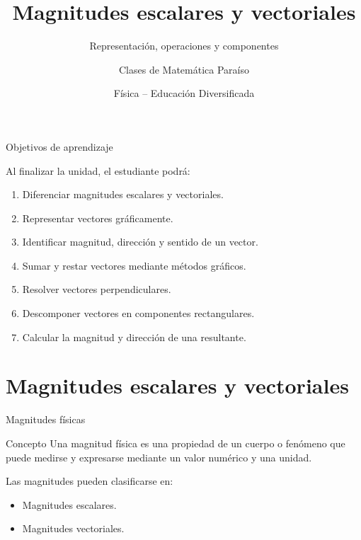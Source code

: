 \documentclass[aspectratio=169,11pt]{beamer}
\title{Magnitudes escalares y vectoriales}
\subtitle{
Representación, operaciones y componentes
}
\author{Clases de Matemática Paraíso}
\date{Física -- Educación Diversificada}
\begin{document}
\begin{frame}
\titlepage
\end{frame}

\begin{frame}{Objetivos de aprendizaje}

Al finalizar la unidad, el estudiante podrá:

\begin{enumerate}
\item Diferenciar magnitudes escalares
y vectoriales.

\item Representar vectores gráficamente.

\item Identificar magnitud, dirección
y sentido de un vector.

\item Sumar y restar vectores mediante
métodos gráficos.

\item Resolver vectores perpendiculares.

\item Descomponer vectores en componentes
rectangulares.

\item Calcular la magnitud y dirección
de una resultante.
\end{enumerate}

\end{frame}

\section{Magnitudes escalares y vectoriales}

\begin{frame}{Magnitudes físicas}

\begin{block}{Concepto}
Una magnitud física es una propiedad
de un cuerpo o fenómeno que puede
medirse y expresarse mediante un
valor numérico y una unidad.
\end{block}

Las magnitudes pueden clasificarse en:

\begin{itemize}
\item Magnitudes escalares.
\item Magnitudes vectoriales.
\end{itemize}

\end{frame}
\end{document}
